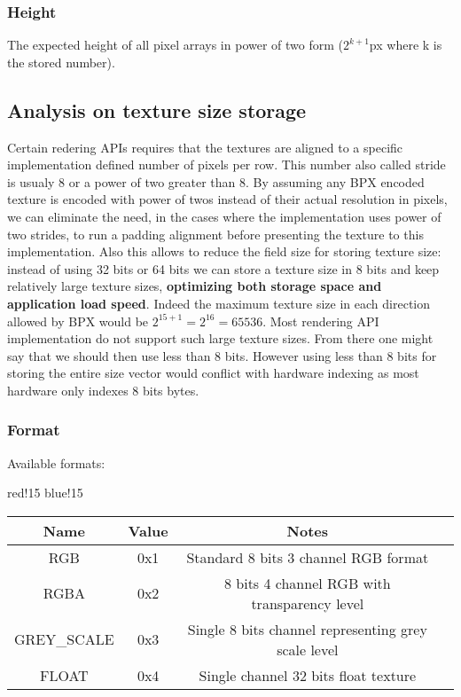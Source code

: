 \subsubsection{Height}
The expected height of all pixel arrays in power of two form ($2^{k+1}$px where k is the stored number).

\subsection{Analysis on texture size storage}
Certain redering APIs requires that the textures are aligned to a specific implementation defined number of pixels per row. This number also called stride is usualy 8 or a power of two greater than 8.\newline
By assuming any BPX encoded texture is encoded with power of twos instead of their actual resolution in pixels, we can eliminate the need, in the cases where the implementation uses power of two strides, to run a padding alignment before presenting the texture to this implementation. Also this allows to reduce the field size for storing texture size: instead of using 32 bits or 64 bits we can store a texture size in 8 bits and keep relatively large texture sizes, \textbf{optimizing both storage space and application load speed}. Indeed the maximum texture size in each direction allowed by BPX would be $2^{15 + 1} = 2^{16} = 65536$. Most rendering API implementation do not support such large texture sizes.\newline
From there one might say that we should then use less than 8 bits. However using less than 8 bits for storing the entire size vector would conflict with hardware indexing as most hardware only indexes 8 bits bytes.

\subsubsection{Format}
Available formats:
\begin{center}
    {
        {red!15}
        {blue!15}
        \begin{tabular}{|c|c|c|c|}
            \hline
            \textbf{Name} & \textbf{Value} & \textbf{Notes} \\

            \hline\hline
            RGB & 0x1 & Standard 8 bits 3 channel RGB format \\
            RGBA & 0x2 & 8 bits 4 channel RGB with transparency level \\
            GREY\_SCALE & 0x3 & Single 8 bits channel representing grey scale level \\
            FLOAT & 0x4 & Single channel 32 bits float texture \\
            \hline
        \end{tabular}
    }
\end{center}


